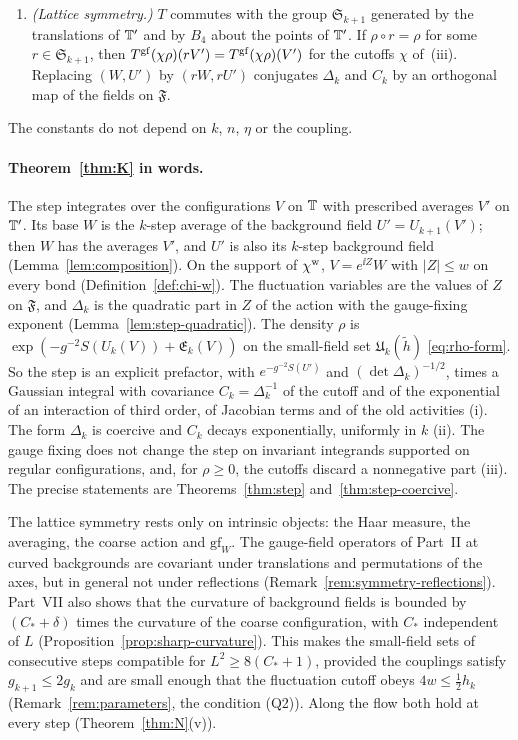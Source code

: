 \begin{maintheorem}
\begin{enumerate}[label=(\roman*)]
\item \emph{(Lattice symmetry.)} $T$ commutes with the group $\mathfrak S_{k+1}$ generated by the translations of $\mathbb T'$ and by $B_4$ about the points of $\mathbb T'$. If $\rho\circ r=\rho$ for some $r\in\mathfrak S_{k+1}$, then $T^{\rm gf}(\chi\rho)(rV')=T^{\rm gf}(\chi\rho)(V')$ for the cutoffs $\chi$ of~(iii). Replacing $(W,U')$ by $(rW,rU')$ conjugates $\Delta_k$ and $C_k$ by an orthogonal map of the fields on $\mathfrak F$.
\end{enumerate}
The constants do not depend on $k$, $n$, $\eta$ or the coupling.
\end{maintheorem}

\paragraph{Theorem~\ref{thm:K} in words.} The step integrates over the configurations $V$ on $\mathbb T$ with prescribed averages $V'$ on $\mathbb T'$. Its base $W$ is the $k$-step average of the background field $U'=U_{k+1}(V')$; then $W$ has the averages $V'$, and $U'$ is also its $k$-step background field (Lemma~\ref{lem:composition}). On the support of $\chi^{\rm w}$, $V=e^{\ii Z}W$ with $|Z|\le w$ on every bond (Definition~\ref{def:chi-w}). The fluctuation variables are the values of $Z$ on $\mathfrak F$, and $\Delta_k$ is the quadratic part in $Z$ of the action with the gauge-fixing exponent (Lemma~\ref{lem:step-quadratic}). The density $\rho$ is $\exp(-g^{-2}S(U_k(V))+\mathfrak E_k(V))$ on the small-field set $\mathfrak U_k(\tilde h)$ \eqref{eq:rho-form}. So the step is an explicit prefactor, with $e^{-g^{-2}S(U')}$ and $(\det\Delta_k)^{-1/2}$, times a Gaussian integral with covariance $C_k=\Delta_k^{-1}$ of the cutoff and of the exponential of an interaction of third order, of Jacobian terms and of the old activities (i). The form $\Delta_k$ is coercive and $C_k$ decays exponentially, uniformly in $k$ (ii). The gauge fixing does not change the step on invariant integrands supported on regular configurations, and, for $\rho\ge0$, the cutoffs discard a nonnegative part (iii). The precise statements are Theorems~\ref{thm:step} and~\ref{thm:step-coercive}.

The lattice symmetry rests only on intrinsic objects: the Haar measure, the averaging, the coarse action and $\mathrm{gf}_W$. The gauge-field operators of Part~II at curved backgrounds are covariant under translations and permutations of the axes, but in general not under reflections (Remark~\ref{rem:symmetry-reflections}). Part~VII also shows that the curvature of background fields is bounded by $(C_*+\delta)$ times the curvature of the coarse configuration, with $C_*$ independent of $L$ (Proposition~\ref{prop:sharp-curvature}). This makes the small-field sets of consecutive steps compatible for $L^2\ge8(C_*+1)$, provided the couplings satisfy $g_{k+1}\le2g_k$ and are small enough that the fluctuation cutoff obeys $4w\le\frac12h_k$ (Remark~\ref{rem:parameters}, the condition (Q2)). Along the flow both hold at every step (Theorem~\ref{thm:N}(v)).

